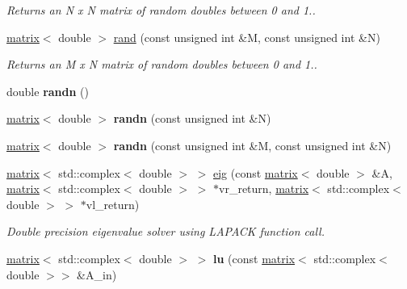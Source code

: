 \begin{DoxyCompactItemize}
\begin{DoxyCompactList}\small\item\em Returns an N x N matrix of random doubles between 0 and 1.. \end{DoxyCompactList}\item 
\hypertarget{namespacekeycpp_af6413232f2de6f8ac96efde6531c3055}{\hyperlink{classkeycpp_1_1matrix}{matrix}$<$ double $>$ \hyperlink{namespacekeycpp_af6413232f2de6f8ac96efde6531c3055}{rand} (const unsigned int \&M, const unsigned int \&N)}\label{namespacekeycpp_af6413232f2de6f8ac96efde6531c3055}

\begin{DoxyCompactList}\small\item\em Returns an M x N matrix of random doubles between 0 and 1.. \end{DoxyCompactList}\item 
\hypertarget{namespacekeycpp_abbb4c27d8c550f3a522dcd4334986161}{double {\bfseries randn} ()}\label{namespacekeycpp_abbb4c27d8c550f3a522dcd4334986161}

\item 
\hypertarget{namespacekeycpp_ab55434470472a4b6c511e5a713a4d654}{\hyperlink{classkeycpp_1_1matrix}{matrix}$<$ double $>$ {\bfseries randn} (const unsigned int \&N)}\label{namespacekeycpp_ab55434470472a4b6c511e5a713a4d654}

\item 
\hypertarget{namespacekeycpp_a43bbf0f2c5e3c68a4e03abcce5aa63da}{\hyperlink{classkeycpp_1_1matrix}{matrix}$<$ double $>$ {\bfseries randn} (const unsigned int \&M, const unsigned int \&N)}\label{namespacekeycpp_a43bbf0f2c5e3c68a4e03abcce5aa63da}

\item 
\hyperlink{classkeycpp_1_1matrix}{matrix}$<$ std\-::complex$<$ double $>$ $>$ \hyperlink{namespacekeycpp_a11eb4ea6f5e22409e718cfd24de6c17a}{eig} (const \hyperlink{classkeycpp_1_1matrix}{matrix}$<$ double $>$ \&A, \hyperlink{classkeycpp_1_1matrix}{matrix}$<$ std\-::complex$<$ double $>$ $>$ $\ast$vr\-\_\-return, \hyperlink{classkeycpp_1_1matrix}{matrix}$<$ std\-::complex$<$ double $>$ $>$ $\ast$vl\-\_\-return)
\begin{DoxyCompactList}\small\item\em Double precision eigenvalue solver using L\-A\-P\-A\-C\-K function call. \end{DoxyCompactList}\item 
\hypertarget{namespacekeycpp_a5fa715d09dd31ec18be5cd455c216faa}{\hyperlink{classkeycpp_1_1matrix}{matrix}$<$ std\-::complex$<$ double $>$ $>$ {\bfseries lu} (const \hyperlink{classkeycpp_1_1matrix}{matrix}$<$ std\-::complex$<$ double $>$$>$ \&A\-\_\-in)}\label{namespacekeycpp_a5fa715d09dd31ec18be5cd455c216faa}


\end{DoxyCompactItemize}
